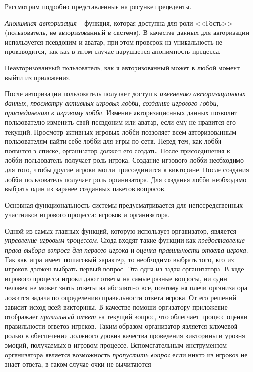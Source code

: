Рассмотрим подробно представленные на рисунке прецеденты.

\emph{Анонимная авторизация} -- функция, которая доступна для роли \linebreak<<Гость>> (пользователь, не авторизованный в системе). 
В качестве данных для авторизации используется псевдоним и аватар, при этом проверок на уникальность не производится, так как в ином случае нарушается анонимность процесса.

Неавторизованный пользователь, как и авторизованный может в любой момент выйти из приложения.

После авторизации пользователь получает доступ к \emph{изменению авторизационных данных}, \emph{просмотру активных игровых лобби}, 
\emph{созданию игрового лобби}, \emph{присоединению к игровому лобби}.
Измение авторизационных данных позволит пользователю изменить свой псевдоним или аватар, если ему не нравится его текущий.
Просмотр активных игровых лобби позволяет всем авторизованным пользователям найти себе лобби для игры по сети. Перед тем, как лобби появится в списке, организатор должен его
создать. После присоединения к лобби пользователь получает роль игрока.
Создание игрового лобби необходимо для того, чтобы другие игроки могли присоединится к викторине. После создания лобби пользователь получает роль организатора. Для создания
лобби необходимо выбрать один из заранее созданных пакетов вопросов.

Основная функциональность системы предусматривается для непосредственных участников игрового процесса: игроков и организатора. 

Одной из самых главных функций, которую использует организатор, является \emph{управление игровым процессом}. Сюда входят такие функции как 
\emph{предоставление права выбора вопроса для первого игрока} и \emph{оценка правильности ответа игрока}. Так как игра имеет пошаговый характер, то необходимо выбрать того,
кто из игроков должен выбрать первый вопрос. Эта одна из задач организатора. В ходе игрового процесса игроки дают ответы на самые разные вопросы, ни один человек 
не может знать ответы на абсолютно все, поэтому на плечи организатора ложится задача по определению правильности ответа игрока. От его решений зависит исход всей викторины. 
В качестве помощи оргизатору приложение отображает \emph{правильный ответ} на текущий вопрос, что облегчает процесс оценки правильности ответов игроков.
Таким образом организатор является ключевой ролью в обеспечении должного уровня качества проведения викторины и уровня эмоций, получаемых в игровом процессе. Вспомогательным
инструментом организатора является возможность \emph{пропустить вопрос} если никто из игроков не знает ответа, в таком случае очки не вычитаются.

